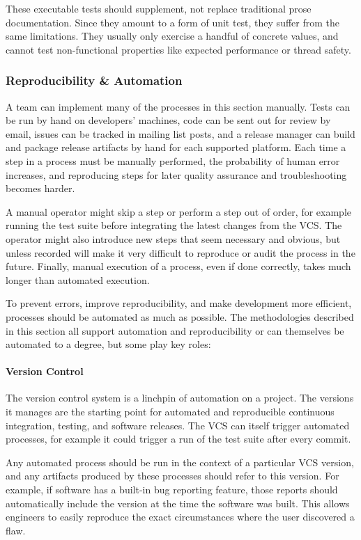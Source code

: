 These executable tests should supplement, not replace traditional
prose documentation. Since they amount to a form of unit test, they
suffer from the same limitations. They usually only exercise a handful
of concrete values, and cannot test non-functional properties like
expected performance or thread safety.

\subsubsection{Reproducibility \& Automation}

A team can implement many of the processes in this section
manually. Tests can be run by hand on developers' machines, code can
be sent out for review by email, issues can be tracked in mailing list
posts, and a release manager can build and package release artifacts
by hand for each supported platform. Each time a step in a process
must be manually performed, the probability of human error increases,
and reproducing steps for later quality assurance and troubleshooting
becomes harder.

A manual operator might skip a step or perform a step out of order,
for example running the test suite before integrating the latest
changes from the VCS. The operator might also introduce new steps that
seem necessary and obvious, but unless recorded will make it very
difficult to reproduce or audit the process in the future. Finally,
manual execution of a process, even if done correctly, takes much
longer than automated execution.

To prevent errors, improve reproducibility, and make development more
efficient, processes should be automated as much as possible. The
methodologies described in this section all support automation and
reproducibility or can themselves be automated to a degree, but some
play key roles:

\paragraph{Version Control}

The version control system is a linchpin of automation on a
project. The versions it manages are the starting point for automated
and reproducible continuous integration, testing, and software
releases. The VCS can itself trigger automated processes, for example
it could trigger a run of the test suite after every commit.

Any automated process should be run in the context of a particular VCS
version, and any artifacts produced by these processes should refer to
this version. For example, if software has a built-in bug reporting
feature, those reports should automatically include the version at the
time the software was built. This allows engineers to easily reproduce
the exact circumstances where the user discovered a flaw.

